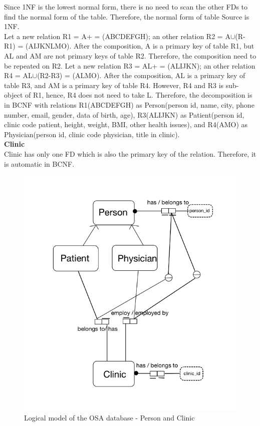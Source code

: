 Since 1NF is the lowest normal form, there is no need to scan the other FDs to find the normal form of the table. Therefore, the normal form of table Source is 1NF.\\
Let a new relation R1 = A+ = (ABCDEFGH); an other relation R2 = A$\cup$(R-R1) = (AIJKNLMO). After the composition, A is a primary key of table R1, but AL and AM are not primary keys of table R2. Therefore, the composition need to be repeated on R2. Let a new relation R3 = AL+ = (ALIJKN); an other relation R4 = AL$\cup$(R2-R3) = (ALMO). After the composition, AL is a primary key of table R3, and AM is a primary key of table R4. However, R4 and R3 is sub-object of R1, hence, R4 does not need to take L. Therefore, the decomposition is in BCNF with relations R1(ABCDEFGH) as Person(person id, name, city, phone number, email, gender, data of birth, age), R3(ALIJKN) as Patient(person id, clinic code patient, height, weight, BMI, other health issues), and R4(AMO) as Physician(person id, clinic code physician, title in clinic).\\
\textbf{Clinic}\\
Clinic has only one FD which is also the primary key of the relation. Therefore, it is automatic in BCNF.\\
\begin{figure}
    \centering
    \includegraphics[width=1.0\textwidth]{Figures/LogicalModelDB1.png}
    \caption{Logical model of the OSA database - Person and Clinic}
    \label{fig:Figures/LogicalModelDB1}
\end{figure}
